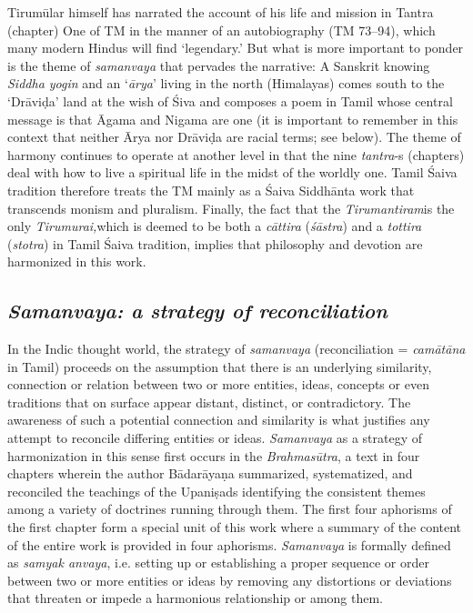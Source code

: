 Tirumūlar himself has narrated the account of his life and mission in Tantra (chapter) One of TM in the manner of an autobiography (TM 73–94), which many modern Hindus will find ‘legendary.’ But what is more important to ponder is the theme of \textit{samanvaya} that pervades the narrative: A Sanskrit knowing \textit{Siddha yogin} and an ‘\textit{ārya}’ living in the north (Himalayas) comes south to the ‘Drāviḍa’ land at the wish of Śiva and composes a poem in Tamil whose central message is that Āgama and Nigama are one (it is important to remember in this context that neither Ārya nor Drāviḍa are racial terms; see below). The theme of harmony continues to operate at another level in that the nine \textit{tantra}-s (chapters) deal with how to live a spiritual life in the midst of the worldly one. Tamil Śaiva tradition therefore treats the TM mainly as a Śaiva Siddhānta work that transcends monism and pluralism. Finally, the fact that the \textit{Tirumantiram}is the only \textit{Tirumurai,}which is deemed to be both a\textit{ cāttira} (\textit{śāstra}) and a\textit{ tottira} (\textit{stotra}) in Tamil Śaiva tradition, implies that philosophy and devotion are harmonized in this work.


\subsection*{\textit{Samanvaya: a strategy of reconciliation}}

In the Indic thought world, the strategy of \textit{samanvaya} (reconciliation = \textit{camātāna} in Tamil) proceeds on the assumption that there is an underlying similarity, connection or relation between two or more entities, ideas, concepts or even traditions that on surface appear distant, distinct, or contradictory. The awareness of such a potential connection and similarity is what justifies any attempt to reconcile differing entities or ideas. \textit{Samanvaya} as a strategy of harmonization in this sense first occurs in the \textit{Brahmasūtra}, a text in four chapters wherein the author Bādarāyaṇa summarized, systematized, and reconciled the teachings of the Upaniṣads identifying the consistent themes among a variety of doctrines running through them. The first four aphorisms of the first chapter form a special unit of this work where a summary of the content of the entire work is provided in four aphorisms. \textit{Samanvaya} is formally defined as \textit{samyak anvaya}, i.e. setting up or establishing a proper sequence or order between two or more entities or ideas by removing any distortions or deviations that threaten or impede a harmonious relationship or among them.

